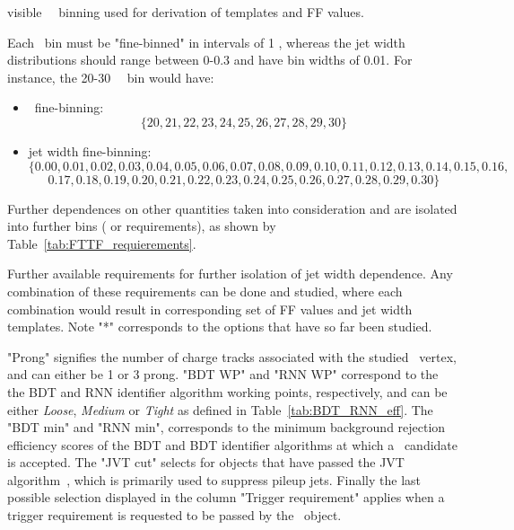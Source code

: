 	\begin{table}[!hbt]
	\caption{visible \htau\ \pt\ binning used for derivation of templates and \ac{FF} values.}
	\begin{center}
	
	\end{center}
	\label{tab:pt_bins}
	\end{table}
	Each \pt\ bin must be "fine-binned" in intervals of 1 \gev, whereas the jet width distributions should range between 0-0.3 and have bin widths of 0.01. For instance, the 20-30 \gev\ \pt\ bin would have:
	\begin{itemize}
	\item \pt\ fine-binning:
		$$\{20,21,22,23,24,25,26,27,28,29,30\}$$
	\item jet width fine-binning:
		$$\{0.00,0.01,0.02,0.03,0.04,0.05,0.06,0.07,0.08,0.09,0.10,0.11,0.12,0.13,0.14,0.15,0.16,$$
		$$0.17,0.18,0.19,0.20,0.21,0.22,0.23,0.24,0.25,0.26,0.27,0.28,0.29,0.30\}$$
\end{itemize}	 
	Further dependences on other quantities taken into consideration and are isolated into further bins ( or requirements), as shown by Table~\ref{tab:FTTF_requierements}. 
	\begin{table}[!hbt]
	\caption{Further available requirements for further isolation of jet width dependence. Any combination of these requirements can be done and studied, where each combination would result in corresponding set of FF values and jet width templates. Note "*" corresponds to the options that have so far been studied.}
	\begin{center}
	
	\end{center}
	\label{tab:FTTF_requierements}
	\end{table}
	"Prong" signifies the number of charge tracks associated with the studied \htau\ vertex, and can either be 1 or 3 prong. "BDT WP" and "RNN WP" correspond to the the \ac{BDT} and \ac{RNN} identifier algorithm working points, respectively, and can be either \textit{Loose}, \textit{Medium} or \textit{Tight} as defined in Table~\ref{tab:BDT_RNN_eff}. The "BDT min" and "RNN min", corresponds to the minimum background rejection efficiency scores of the \ac{BDT} and \ac{BDT} identifier algorithms at which a \htau\ candidate is accepted. 
	The "JVT cut" selects for objects that have passed the \ac{JVT} algorithm~\cite{ATLAS-CONF-2014-018}, which is primarily used to suppress pileup jets. Finally the last possible selection displayed in the column "Trigger requirement" applies when a trigger requirement is requested to be passed by the \htau\ object.
	
